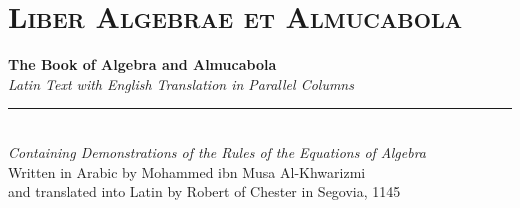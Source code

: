 \documentclass[11pt,a4paper,twoside]{book}
\begin{document}
\part{\textsc{Liber Algebrae et Almucabola}}
\label{part:main}

\begin{center}
{\Large\bfseries\color{titlecolor} The Book of Algebra and Almucabola}\\[0.3cm]
{\normalsize\textit{Latin Text with English Translation in Parallel Columns}}\\[0.5cm]
{\color{chapterline}\rule{0.6\textwidth}{1pt}}\\[0.5cm]
{\small\textit{Containing Demonstrations of the Rules of the Equations of Algebra}\\[0.2cm]
Written in Arabic by Mohammed ibn Musa Al-Khwarizmi \\ and translated into Latin by Robert of Chester in Segovia, 1145}
\end{center}

\vspace{0.5cm}
\end{document}
